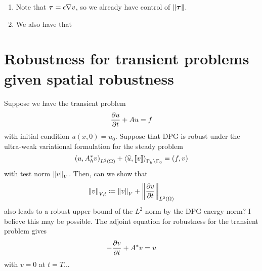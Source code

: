 \documentclass{article}
\begin{document}
\begin{enumerate}
\item Note that $\boldsymbol\tau=\epsilon\nabla v$, so we already have control of $\left\| \boldsymbol\tau \right\|$.
\item We also have that 
\end{enumerate}


\section{Robustness for transient problems given spatial robustness}

Suppose we have the transient problem
\[
\frac{\partial u}{\partial t} + Au = f
\]
with initial condition $u(x,0) = u_0$.  Suppose that DPG is robust under the ultra-weak variational formulation for the steady problem
\[
\left( u,A^*_h v \right)_{L^2\left( \Omega \right)} + \left\langle \widehat{u}, \left[ \![v]\! \right] \right\rangle_{\Gamma_h\setminus \Gamma_0} = \left( f,v \right)
\]
with test norm $\left\| v \right\|_{V}$.  Then, can we show that 
\[
\left\| v \right\|_{V,t} \coloneqq \left\| v \right\|_V + \left\| \frac{\partial v}{\partial t} \right\|_{L^2\left( \Omega \right)}
\]
also leads to a robust upper bound of the $L^2$ norm by the DPG energy norm?  I believe this may be possible.  The adjoint equation for robustness for the transient problem gives
\[
-\frac{\partial v}{\partial t} + A^*v = u
\]
with $v = 0$ at $t=T$...  
\end{document}
